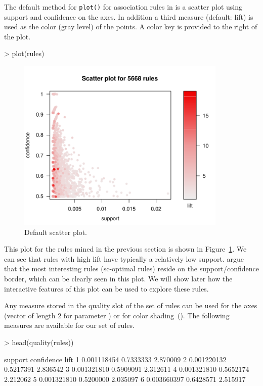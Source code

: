 \documentclass[nojss]{jss}
\newcommand{\func}[1]{\mbox{\texttt{#1()}}}
\begin{document}
The default method for \func{plot} for association rules
in 
is a scatter plot using support and confidence on the axes.
In addition a third measure (default: lift) is used as the color (gray level)
of the points. A color key is provided to the right of the plot.

\begin{Schunk}
\begin{Sinput}
> plot(rules)
\end{Sinput}
\end{Schunk}

\begin{figure}
\centering
\includegraphics[width=10cm]{arulesViz-scatterplot1}
\caption{Default scatter plot.\label{fig:scatterplot1}}
\end{figure}

This plot for the rules mined in the previous section is shown in
Figure~\ref{fig:scatterplot1}. We can see
that rules with high lift
have typically a relatively low support.
\cite{arulesViz:Bayardo:1999} argue that
the most interesting rules (sc-optimal rules)
reside on the support/confidence border, which can be clearly seen in this
plot. We will show later how the interactive features of this
plot can be used to explore these rules.

Any measure stored in the quality slot of the set of rules can be used
for the axes (vector of length 2 for parameter )
or for color shading~().
The following measures are available for our set of
rules.
\begin{Schunk}
\begin{Sinput}
> head(quality(rules))
\end{Sinput}
\begin{Soutput}
      support confidence     lift
1 0.001118454  0.7333333 2.870009
2 0.001220132  0.5217391 2.836542
3 0.001321810  0.5909091 2.312611
4 0.001321810  0.5652174 2.212062
5 0.001321810  0.5200000 2.035097
6 0.003660397  0.6428571 2.515917
\end{Soutput}
\end{Schunk}
\end{document}
